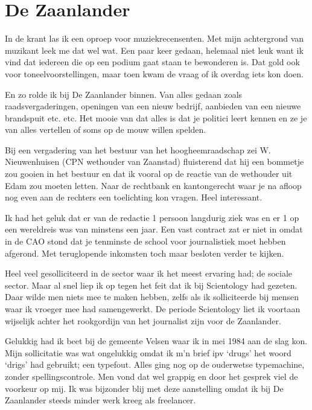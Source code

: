 \documentclass[10pt,twoside,openright]{memoir}
\begin{document}
\chapter{De Zaanlander} %
\label{cha:zaanlander}

In de krant las ik een oproep voor muziekrecensenten. Met mijn achtergrond van muzikant leek me dat wel wat. Een paar keer gedaan, helemaal niet leuk want ik vind dat iedereen die op een podium gaat staan te bewonderen is. Dat gold ook voor toneelvoorstellingen, maar toen kwam de vraag of ik overdag iets kon doen. 

En zo rolde ik bij De Zaanlander binnen. Van alles gedaan zoals raadsvergaderingen, openingen van een nieuw bedrijf, aanbieden van een nieuwe brandspuit etc. etc. Het mooie van dat alles is dat je politici leert kennen en ze je van alles vertellen of soms op de mouw willen spelden. 

Bij een vergadering van het bestuur van het hoogheemraadschap zei W. Nieuwenhuisen (CPN wethouder van Zaanstad) fluisterend dat hij een bommetje zou gooien in het bestuur en dat ik vooral op de reactie van de wethouder uit Edam zou moeten letten. Naar de rechtbank en kantongerecht waar je na afloop nog even aan de rechters een toelichting kon vragen. Heel interessant. 

Ik had het geluk dat er van de redactie 1 persoon langdurig ziek was en er 1 op een wereldreis was van minstens een jaar. Een vast contract zat er niet in omdat in de CAO stond dat je tenminste de school voor journalistiek moet hebben afgerond. Met teruglopende inkomsten toch maar besloten verder te kijken.

Heel veel gesolliciteerd in de sector waar ik het meest ervaring had; de sociale sector. Maar al snel liep ik op tegen het feit dat ik bij Scientology had gezeten. Daar wilde men niets mee te maken hebben, zelfs als ik solliciteerde bij mensen waar ik vroeger mee had samengewerkt. De periode Scientology liet ik voortaan wijselijk achter het rookgordijn van het journalist zijn voor de Zaanlander. 

Gelukkig had ik beet bij de gemeente Velsen waar ik in mei 1984 aan de slag kon. Mijn sollicitatie was wat ongelukkig omdat ik m’n brief ipv ‘drugs’ het woord ‘drigs’ had gebruikt; een typefout. Alles ging nog op de ouderwetse typemachine, zonder spellingscontrole. Men vond dat wel grappig en door het gesprek viel de voorkeur op mij. Ik was bijzonder blij met deze aanstelling omdat ik bij De Zaanlander steeds minder werk kreeg als freelancer.
\end{document}
